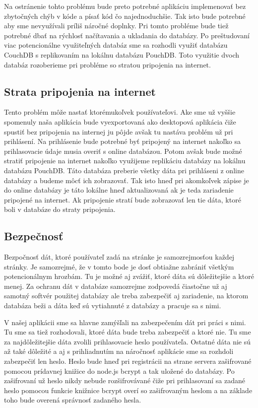 \indent Na ostránenie tohto problému bude preto potrebné aplikáciu implemenovať bez zbytočných chýb v kóde a písať kód čo najednoduchšie. Tak isto bude potrebné aby sme nevyužívali príliš náročné doplnky. Pri tomto probléme bude tiež potrebné dbať na rýchlosť načítavania a ukladania do databázy. Po preštudovaní viac potencionálne využiteľných databáz sme sa rozhodli využiť databázu CouchDB s replikovaním na lokálnu databázu PouchDB. Toto využitie dvoch databáz rozoberieme pri probléme so stratou pripojenia na internet.

\subsection{Strata pripojenia na internet}
\indent Tento problém môže nastať ktorémukoľvek používateľovi. Ake sme už vyššie spomenuly naša aplikácia bude vyexportovaná ako desktopová aplikácia čiže spustiť bez pripojenia na internej ju pôjde avšak tu nastáva problém už pri prihlásení. Na prihlásenie bude potrebné byť pripojený na internet nakoľko sa prihlasovacie údaje musia overiť s online databázou. Potom avšak bude možné stratiť pripojenie na internet nakoľko využijeme replikáciu databázy na lokálnu databázu PouchDB. Táto databáza preberie všetky dáta pri prihláseni z online databázy a budeme môcť ich zobrazovať. Tak isto hneď pri akomkoľvek zápise je do online databázy je táto lokálne hneď aktualizovaná ak je teda zariadenie pripojené na internet. Ak pripojenie stratí bude zobrazovať len tie dáta, ktoré boli v databáze do straty pripojenia. 

\subsection{Bezpečnosť}
\indent Bezpočnosť dát, ktoré používateľ zadá na stránke je samozrejmosťou každej stránky. Je samozrejmé, že v tomto bode je dosť obtiažne zabrániť všetkým potencionálnym hrozbám. Tu je možné aj zvážiť, ktoré dáta sú dôležitejšie a ktoré menej. Za ochranu dát v databáze samozrejme zodpovedá čiastočne už aj samotný softvér použitej databázy ale treba zabezpečiť aj zariadenie, na ktorom databáza beži a dáta keď sú vytiahnuté z databázy a pracuje sa s nimi.

\indent V našej aplikácii sme sa hlavne zamýšľali na zabezpečením dát pri práci s nimi. Tu sme sa tiež rozhodovali, ktoré dáta bude treba zabezpečiť a ktoré nie. Tu sme za najdôležitejšie dáta zvolili prihlasovacie heslo používateľa. Ostatné dáta nie sú až také dôležité a aj s prihliadnutím na náročnosť aplikácie sme sa rozhdoli zabezpečiť len heslo. Heslo bude hneď pri registrácii na strane servera zašifrované pomocou prídavnej knižice do node.js bcrypt a tak uložené do databázy. Po zašifrovaní už heslo nikdy nebude rozšifrovávané čiže pri prihlasovaní sa zadané heslo pomocou funkcie knižnice bcrypt overí so zašifrovaným heslom a na základe toho bude overená správnosť zadaného hesla. 

